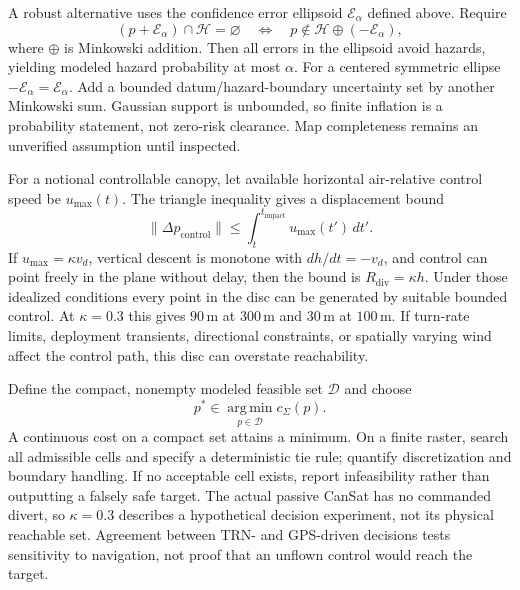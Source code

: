 A robust alternative uses the confidence error ellipsoid
$\mathcal E_\alpha$ defined above. Require
\begin{equation}
 (p+\mathcal E_\alpha)\cap\mathcal H=\varnothing
 \quad\Longleftrightarrow\quad
 p\notin\mathcal H\oplus(-\mathcal E_\alpha),
\end{equation}
where $\oplus$ is Minkowski addition. Then all errors in the ellipsoid
avoid hazards, yielding modeled hazard probability at most $\alpha$.
For a centered symmetric ellipse $-\mathcal E_\alpha=\mathcal E_\alpha$.
Add a bounded datum/hazard-boundary uncertainty set by another Minkowski
sum. Gaussian support is unbounded, so finite inflation is a probability
statement, not zero-risk clearance. Map completeness remains an
unverified assumption until inspected.

For a notional controllable canopy, let available horizontal
air-relative control speed be $u_{\max}(t)$. The triangle inequality
gives a displacement bound
\begin{equation}
 \|\Delta p_{\mathrm{control}}\|
 \leq\int_t^{t_{\mathrm{impact}}}u_{\max}(t')\,dt'.
\end{equation}
If $u_{\max}=\kappa v_d$, vertical descent is monotone with
$dh/dt=-v_d$, and control can point freely in the plane without delay,
then the bound is $R_{\mathrm{div}}=\kappa h$. Under those idealized
conditions every point in the disc can be generated by suitable bounded
control. At $\kappa=0.3$ this gives $90\,\mathrm m$ at $300\,\mathrm m$
and $30\,\mathrm m$ at $100\,\mathrm m$. If turn-rate limits,
deployment transients, directional constraints, or spatially varying
wind affect the control path, this disc can overstate reachability.

Define the compact, nonempty modeled feasible set $\mathcal D$ and choose
\begin{equation}
 p^*\in\operatorname*{arg\,min}_{p\in\mathcal D}c_\Sigma(p).
\end{equation}
A continuous cost on a compact set attains a minimum. On a finite
raster, search all admissible cells and specify a deterministic tie
rule; quantify discretization and boundary handling. If no acceptable
cell exists, report infeasibility rather than outputting a falsely
safe target. The actual passive CanSat has no commanded divert, so
$\kappa=0.3$ describes a hypothetical decision experiment, not its
physical reachable set. Agreement between TRN- and GPS-driven decisions
tests sensitivity to navigation, not proof that an unflown control
would reach the target.

